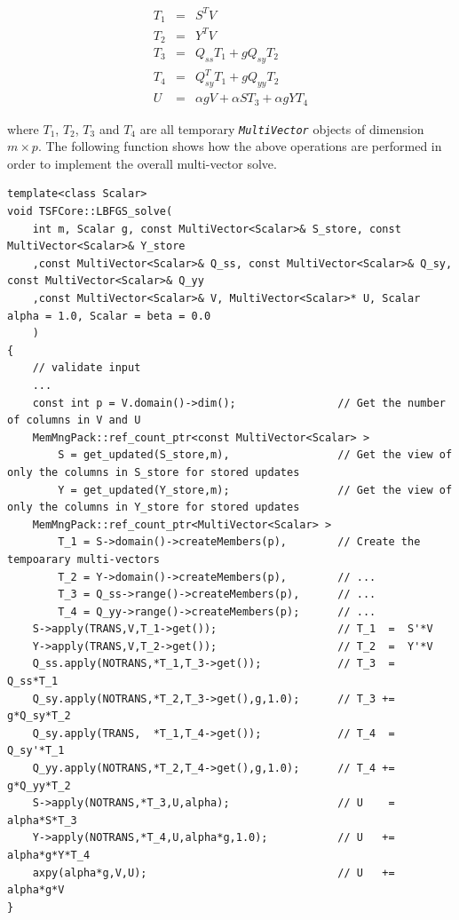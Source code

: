 \begin{eqnarray*}
T_1 & = & S^T V \\
T_2 & = & Y^T V \\
T_3 & = & Q_{ss} T_1 + g Q_{sy} T_2 \\
T_4 & = & Q_{sy}^T T_1 + g Q_{yy} T_2 \\
U   & = & \alpha g V + \alpha S T_3 + \alpha g Y T_4
\end{eqnarray*}

where $T_1$, $T_2$, $T_3$ and $T_4$ are all temporary
\texttt{\textit{Multi\-Vector}} objects of dimension $m \times p$.  The
following function shows how the above operations are performed in
order to implement the overall multi-vector solve.

{\tiny\begin{verbatim}
template<class Scalar>
void TSFCore::LBFGS_solve(
    int m, Scalar g, const MultiVector<Scalar>& S_store, const MultiVector<Scalar>& Y_store
    ,const MultiVector<Scalar>& Q_ss, const MultiVector<Scalar>& Q_sy, const MultiVector<Scalar>& Q_yy
    ,const MultiVector<Scalar>& V, MultiVector<Scalar>* U, Scalar alpha = 1.0, Scalar = beta = 0.0
    )
{
    // validate input
    ...
    const int p = V.domain()->dim();                // Get the number of columns in V and U
    MemMngPack::ref_count_ptr<const MultiVector<Scalar> >
        S = get_updated(S_store,m),                 // Get the view of only the columns in S_store for stored updates
        Y = get_updated(Y_store,m);                 // Get the view of only the columns in Y_store for stored updates
    MemMngPack::ref_count_ptr<MultiVector<Scalar> >
        T_1 = S->domain()->createMembers(p),        // Create the tempoarary multi-vectors
        T_2 = Y->domain()->createMembers(p),        // ...
        T_3 = Q_ss->range()->createMembers(p),      // ...
        T_4 = Q_yy->range()->createMembers(p);      // ...
    S->apply(TRANS,V,T_1->get());                   // T_1  =  S'*V
    Y->apply(TRANS,V,T_2->get());                   // T_2  =  Y'*V
    Q_ss.apply(NOTRANS,*T_1,T_3->get());            // T_3  =  Q_ss*T_1
    Q_sy.apply(NOTRANS,*T_2,T_3->get(),g,1.0);      // T_3 +=  g*Q_sy*T_2
    Q_sy.apply(TRANS,  *T_1,T_4->get());            // T_4  =  Q_sy'*T_1
    Q_yy.apply(NOTRANS,*T_2,T_4->get(),g,1.0);      // T_4 +=  g*Q_yy*T_2
    S->apply(NOTRANS,*T_3,U,alpha);                 // U    =  alpha*S*T_3
    Y->apply(NOTRANS,*T_4,U,alpha*g,1.0);           // U   +=  alpha*g*Y*T_4
    axpy(alpha*g,V,U);                              // U   +=  alpha*g*V
}
\end{verbatim}}

